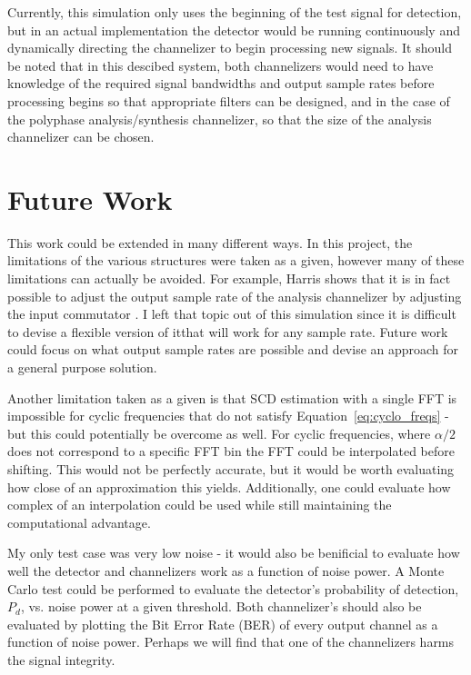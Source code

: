 \documentclass[12pt]{report}
\begin{document}
Currently, this simulation only uses the beginning of the test signal for
detection, but in an actual implementation the detector would be running
continuously and dynamically directing the channelizer to begin processing new
signals. It should be noted that in this descibed system, both channelizers would
need to have knowledge of the required signal bandwidths and output sample
rates before processing begins so that appropriate filters can be designed, and
in the case of the polyphase analysis/synthesis channelizer, so that the size
of the analysis channelizer can be chosen.

\section{Future Work}
This work could be extended in many different ways. In this project, the
limitations of the various structures were taken as a given, however many of
these limitations can actually be avoided. For example, Harris shows that it is
in fact possible to adjust the output sample rate of the analysis channelizer
by adjusting the input commutator \cite{Harris1}. I left that topic out of this
simulation since it is difficult to devise a flexible version of itthat will
work for any sample rate. Future work could focus on what output sample rates
are possible and devise an approach for a general purpose solution.

Another limitation taken as a given is that SCD estimation with a single FFT is
impossible for cyclic frequencies that do not satisfy
Equation~\ref{eq:cyclo_freqs} - but this could potentially be overcome as well.
For cyclic frequencies, where $\alpha/2$ does not correspond to a specific FFT
bin the FFT could be interpolated before shifting. This would not be perfectly
accurate, but it would be worth evaluating how close of an approximation this
yields. Additionally, one could evaluate how complex of an interpolation could
be used while still maintaining the computational advantage.

My only test case was very low noise - it would also be benificial to evaluate
how well the detector and channelizers work as a function of noise power. A Monte
Carlo test could be performed to evaluate the detector's probability of
detection, $P_d$, vs. noise power at a given threshold. Both channelizer's should also be evaluated by plotting the Bit Error Rate (BER) of every output channel as a function of noise power. Perhaps we will find that one of the channelizers harms the signal integrity.
\end{document}
